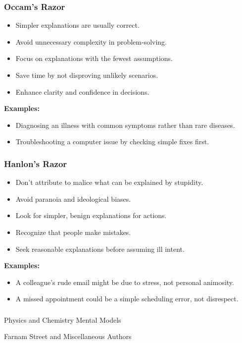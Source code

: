 \begin{frame}[fragile]\frametitle{Occam’s Razor}
\begin{itemize}
    \item Simpler explanations are usually correct.
    \item Avoid unnecessary complexity in problem-solving.
    \item Focus on explanations with the fewest assumptions.
    \item Save time by not disproving unlikely scenarios.
    \item Enhance clarity and confidence in decisions.
\end{itemize}
\textbf{Examples:}
\begin{itemize}
    \item Diagnosing an illness with common symptoms rather than rare diseases.
    \item Troubleshooting a computer issue by checking simple fixes first.
\end{itemize}

\end{frame}

\begin{frame}[fragile]\frametitle{Hanlon’s Razor}
\begin{itemize}
    \item Don’t attribute to malice what can be explained by stupidity.
    \item Avoid paranoia and ideological biases.
    \item Look for simpler, benign explanations for actions.
    \item Recognize that people make mistakes.
    \item Seek reasonable explanations before assuming ill intent.
\end{itemize}
\textbf{Examples:}
\begin{itemize}
    \item A colleague's rude email might be due to stress, not personal animosity.
    \item A missed appointment could be a simple scheduling error, not disrespect.
\end{itemize}
\end{frame}


\begin{frame}[fragile]\frametitle{}
\begin{center}
{\Large Physics and Chemistry Mental Models}

{\tiny Farnam Street and Miscellaneous Authors }


\end{center}
\end{frame}

